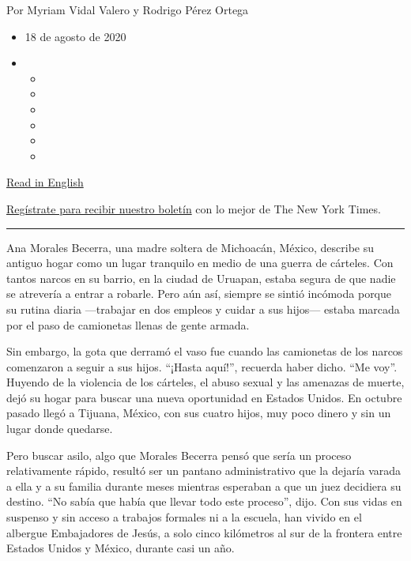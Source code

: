 Por Myriam Vidal Valero y Rodrigo Pérez Ortega

\begin{itemize}
\item
  18 de agosto de 2020
\item
  \begin{itemize}
  \item
  \item
  \item
  \item
  \item
  \item
  \end{itemize}
\end{itemize}

\href{https://www.nytimes3xbfgragh.onion/2020/08/18/parenting/migrant-children-school-border.html}{Read
in English}

\href{https://www.nytimes3xbfgragh.onion/newsletters/el-times}{Regístrate
para recibir nuestro boletín} con lo mejor de The New York Times.

\begin{center}\rule{0.5\linewidth}{\linethickness}\end{center}

Ana Morales Becerra, una madre soltera de Michoacán, México, describe su
antiguo hogar como un lugar tranquilo en medio de una guerra de
cárteles. Con tantos narcos en su barrio, en la ciudad de Uruapan,
estaba segura de que nadie se atrevería a entrar a robarle. Pero aún
así, siempre se sintió incómoda porque su rutina diaria ---trabajar en
dos empleos y cuidar a sus hijos--- estaba marcada por el paso de
camionetas llenas de gente armada.

Sin embargo, la gota que derramó el vaso fue cuando las camionetas de
los narcos comenzaron a seguir a sus hijos. ``¡Hasta aquí!'', recuerda
haber dicho. ``Me voy''. Huyendo de la violencia de los cárteles, el
abuso sexual y las amenazas de muerte, dejó su hogar para buscar una
nueva oportunidad en Estados Unidos. En octubre pasado llegó a Tijuana,
México, con sus cuatro hijos, muy poco dinero y sin un lugar donde
quedarse.

Pero buscar asilo, algo que Morales Becerra pensó que sería un proceso
relativamente rápido, resultó ser un pantano administrativo que la
dejaría varada a ella y a su familia durante meses mientras esperaban a
que un juez decidiera su destino. ``No sabía que había que llevar todo
este proceso'', dijo. Con sus vidas en suspenso y sin acceso a trabajos
formales ni a la escuela, han vivido en el albergue Embajadores de
Jesús, a solo cinco kilómetros al sur de la frontera entre Estados
Unidos y México, durante casi un año.

